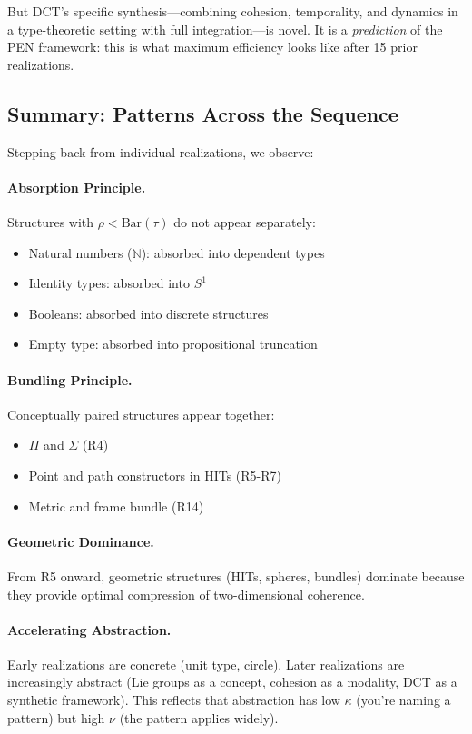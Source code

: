\documentclass[11pt]{article}
\theoremstyle{definition}
\begin{document}
But DCT's specific synthesis—combining cohesion, temporality, and dynamics in a type-theoretic setting with full integration—is novel. It is a \emph{prediction} of the PEN framework: this is what maximum efficiency looks like after 15 prior realizations.

\subsection{Summary: Patterns Across the Sequence}

Stepping back from individual realizations, we observe:

\paragraph{Absorption Principle.}
Structures with $\rho < \text{Bar}(\tau)$ do not appear separately:
\begin{itemize}
\item Natural numbers ($\mathbb{N}$): absorbed into dependent types
\item Identity types: absorbed into $S^1$
\item Booleans: absorbed into discrete structures
\item Empty type: absorbed into propositional truncation
\end{itemize}

\paragraph{Bundling Principle.}
Conceptually paired structures appear together:
\begin{itemize}
\item $\Pi$ and $\Sigma$ (R4)
\item Point and path constructors in HITs (R5-R7)
\item Metric and frame bundle (R14)
\end{itemize}

\paragraph{Geometric Dominance.}
From R5 onward, geometric structures (HITs, spheres, bundles) dominate because they provide optimal compression of two-dimensional coherence.

\paragraph{Accelerating Abstraction.}
Early realizations are concrete (unit type, circle). Later realizations are increasingly abstract (Lie groups as a concept, cohesion as a modality, DCT as a synthetic framework). This reflects that abstraction has low $\kappa$ (you're naming a pattern) but high $\nu$ (the pattern applies widely).
\end{document}
